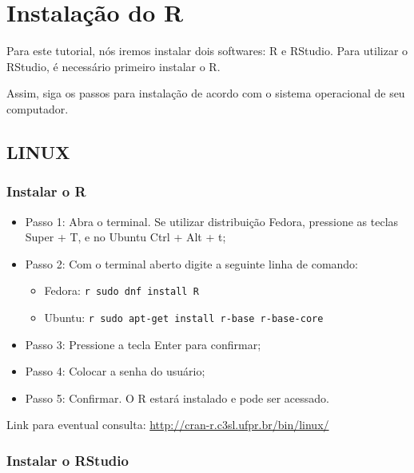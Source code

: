 \documentclass[
  brazil,
]{book}
\providecommand{\tightlist}{%
  \setlength{\itemsep}{0pt}\setlength{\parskip}{0pt}}
\begin{document}
\hypertarget{instalauxe7uxe3o-do-r}{%
\chapter{Instalação do R}\label{instalauxe7uxe3o-do-r}}

Para este tutorial, nós iremos instalar dois softwares: R e RStudio. Para utilizar o RStudio, é necessário primeiro instalar o R.

Assim, siga os passos para instalação de acordo com o sistema operacional de seu computador.

\hypertarget{linux}{%
\section{LINUX}\label{linux}}

\hypertarget{instalar-o-r}{%
\subsection{Instalar o R}\label{instalar-o-r}}

\begin{itemize}
\tightlist
\item
  Passo 1: Abra o terminal. Se utilizar distribuição Fedora, pressione as teclas Super + T, e no Ubuntu Ctrl + Alt + t;\\
\item
  Passo 2: Com o terminal aberto digite a seguinte linha de comando:

  \begin{itemize}
  \tightlist
  \item
    Fedora: \texttt{r\ sudo\ dnf\ install\ R}
  \item
    Ubuntu: \texttt{r\ sudo\ apt-get\ install\ r-base\ r-base-core}\\
  \end{itemize}
\item
  Passo 3: Pressione a tecla Enter para confirmar;\\
\item
  Passo 4: Colocar a senha do usuário;\\
\item
  Passo 5: Confirmar. O R estará instalado e pode ser acessado.
\end{itemize}

Link para eventual consulta: \url{http://cran-r.c3sl.ufpr.br/bin/linux/}

\hypertarget{instalar-o-rstudio}{%
\subsection{Instalar o RStudio}\label{instalar-o-rstudio}}
\end{document}
